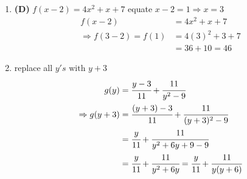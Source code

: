 \begin{multicols}{2}
\begin{enumerate}[label={\textbf{\arabic*.}}]
    \item \textbf{(D)} $f(x - 2) = 4x^2 + x + 7 $ equate $x - 2 = 1 \Rightarrow x = 3$ 
    \begin{align*} 
        f(x - 2) &= 4x^2 + x + 7 \\
        \Rightarrow  f(3 - 2) = f(1) &= 4(3)^2 + 3 + 7 \\
        & = 36 + 10 = 46
    \end{align*}

    \item replace all $y's \text { with } y + 3  $ 
    \begin{align*} 
        g(y) &= \cfrac{y - 3}{11} + \cfrac{11}{y^2 - 9} \\
       \Rightarrow  g(y + 3) &= \cfrac{(y + 3) - 3}{11} + \cfrac{11}{(y + 3)^2 - 9}  \\
        & = \cfrac{y}{11} + \cfrac{11}{y^2 + 6y + 9 -9} \\
        & = \cfrac{y}{11} + \cfrac{11}{y^2 + 6y} = \cfrac{y}{11} + \cfrac{11}{y (y + 6 ) }
    \end {align*}



\end{enumerate}
\end{multicols}
